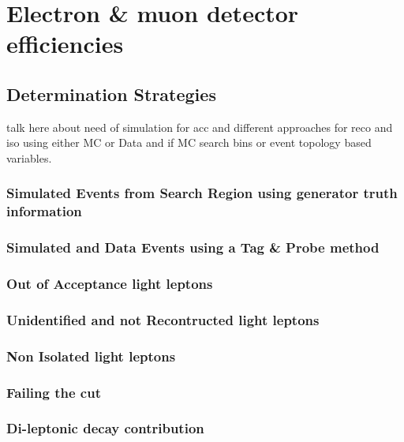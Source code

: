 \section{Electron \& muon detector efficiencies}
\label{sec:Lost_Lepton_Efficiencies_Main}
\subsection{Determination Strategies}
\label{sec:Lost_Lepton_Efficiencies_Strategies}
\todo talk here about need of simulation for acc and different approaches for reco and iso using either MC or Data and if MC search bins or event topology based variables. 
\subsubsection{Simulated Events from Search Region using generator truth information}
\label{sec:Lost_Lepton_Efficiencies_Truth}
\subsubsection{Simulated and Data Events using a Tag \& Probe method}
\label{sec:Lost_Lepton_Tag_Probe}

\subsubsection{Out of Acceptance light leptons}
\label{sec:Lost_Lepton_Tag_Probe}

\subsubsection{Unidentified and not Recontructed light leptons}
\label{sec:Lost_Lepton_Tag_Probe}

\subsubsection{Non Isolated light leptons}
\label{sec:Lost_Lepton_Tag_Probe}

\subsubsection{Failing the \mt cut}
\label{sec:Lost_Lepton_Tag_Probe}

\subsubsection{Di-leptonic \ttbar decay contribution}
\label{sec:Lost_Lepton_Tag_Probe}






